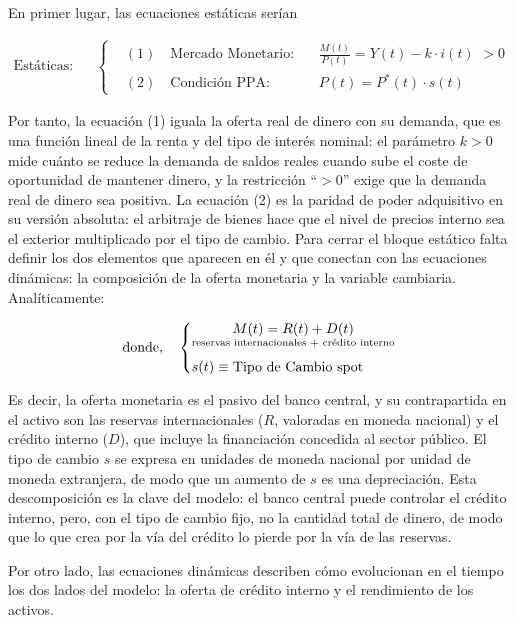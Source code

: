 \documentclass[10pt,a4paper]{article}
\begin{document}
En primer lugar, las ecuaciones estáticas serían


$$\begin{aligned}
  \text{Estáticas}:
    &&\left\{\begin{aligned}
        &(1)\quad\text{Mercado Monetario}: && \frac{M(t)}{P(t)}=Y(t)-k\cdot i(t)\,\,>0\\[1em]
        &(2)\quad\text{Condición PPA}: &&P(t)=P^*(t)\cdot s(t)
    \end{aligned}\right.
\end{aligned}$$

Por tanto, la ecuación (1) iguala la oferta real de dinero con su demanda, que es una función lineal de la renta y del tipo de interés nominal: el parámetro $k>0$ mide cuánto se reduce la demanda de saldos reales cuando sube el coste de oportunidad de mantener dinero, y la restricción ``$>0$'' exige que la demanda real de dinero sea positiva. La ecuación (2) es la paridad de poder adquisitivo en su versión absoluta: el arbitraje de bienes hace que el nivel de precios interno sea el exterior multiplicado por el tipo de cambio. Para cerrar el bloque estático falta definir los dos elementos que aparecen en él y que conectan con las ecuaciones dinámicas: la composición de la oferta monetaria y la variable cambiaria. Analíticamente:


$$\text{donde,}
    \quad\left\{
    \begin{aligned}
        &\underset{\text{\scriptsize reservas internacionales $+$ crédito interno}}{M(t)=R(t)+D(t)}\\[0.5em]
        &s(t)\equiv \text{Tipo de Cambio spot}
    \end{aligned}\right.$$

Es decir, la oferta monetaria es el pasivo del banco central, y su contrapartida en el activo son las reservas internacionales ($R$, valoradas en moneda nacional) y el crédito interno ($D$), que incluye la financiación concedida al sector público. El tipo de cambio $s$ se expresa en unidades de moneda nacional por unidad de moneda extranjera, de modo que un aumento de $s$ es una depreciación. Esta descomposición es la clave del modelo: el banco central puede controlar el crédito interno, pero, con el tipo de cambio fijo, no la cantidad total de dinero, de modo que lo que crea por la vía del crédito lo pierde por la vía de las reservas.

Por otro lado, las ecuaciones dinámicas describen cómo evolucionan en el tiempo los dos lados del modelo: la oferta de crédito interno y el rendimiento de los activos.
\end{document}
